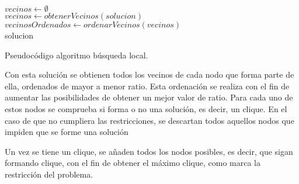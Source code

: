 \begin{algorithm}
	$ vecinos \gets \emptyset $ \\[0.2cm]
	$ vecinos \gets obtenerVecinos(solucion)$ \\[0.2cm]
	$ vecinosOrdenados \gets ordenarVecinos(vecinos)$ \\[0.2cm]
	\Return solucion
	\caption{Pseudocódigo algoritmo búsqueda local.}
	\label{alg:bl}
\end{algorithm}

Con esta solución se obtienen todos los vecinos de cada nodo que forma parte de ella, ordenados de mayor a menor ratio. Esta ordenación se realiza con el fin de aumentar las posibilidades de obtener un mejor valor de ratio. Para cada uno de estos nodos se comprueba si forma o no una solución, es decir, un clique. En el caso de que no cumpliera las restricciones, se descartan todos aquellos nodos que impiden que se forme una solución

Un vez se tiene un clique, se añaden todos los nodos posibles, es decir, que sigan formando clique, con el fin de obtener el máximo clique, como marca la restricción del problema.


